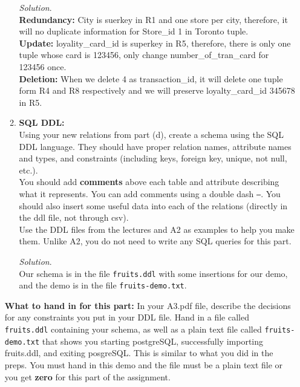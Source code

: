 \documentclass[10pt]{article}
\begin{document}
\begin{enumerate}
\begin{enumerate}
        \begin{mdframed}[leftmargin=-6.5mm]
        \textit{Solution}.\\
        \textbf{Redundancy:} City is suerkey in R1 and one store per city, therefore, it will no duplicate information for Store\_id 1 in Toronto tuple.\\
        \textbf{Update:} loyality\_card\_id is superkey in R5, therefore, there is only one tuple whose card is 123456, only change number\_of\_tran\_card for 123456 once.\\
        \textbf{Deletion:} When we delete 4 as transaction\_id, it will delete one tuple form R4 and R8 respectively and we will preserve loyalty\_card\_id 345678 in R5.
        \end{mdframed}
        
        \item \textbf{SQL DDL:}\\
        Using your new relations from part (d), create a schema using the SQL DDL language. They should have proper relation names, attribute names and types, and constraints (including keys, foreign key, unique, not null, etc.).\\
        You should add \textbf{comments} above each table and attribute describing what it represents. You can add comments using a double dash \texttt{--}. You should also insert some useful data into each of the relations (directly in the ddl file, not through csv).\\
        Use the DDL files from the lectures and A2 as examples to help you make them. Unlike A2, you do not need to write any SQL queries for this part.
        
        \begin{mdframed}[leftmargin=-6.5mm]
        \textit{Solution}.\\
        Our schema is in the file \texttt{fruits.ddl} with some insertions for our demo,\\
        and the demo is in the file \texttt{fruits-demo.txt}.
        \end{mdframed}
        
    \end{enumerate}
    
    \textbf{What to hand in for this part:}
    In your A3.pdf file, describe the decisions for any constraints you put in your DDL file. Hand in a file called \texttt{fruits.ddl} containing your schema, as well as a plain text file called \texttt{fruits-demo.txt} that shows you starting postgreSQL, successfully importing fruits.ddl, and exiting posgreSQL. This is similar to what you did in the preps. You must hand in this demo and the file must be a plain text file or you get \textbf{zero} for this part of the assignment.
\end{enumerate}
\end{document}
